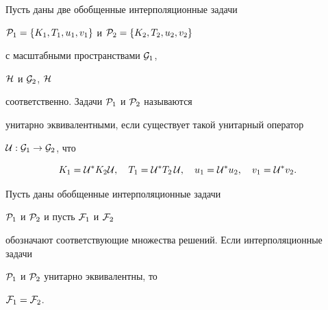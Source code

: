 \begin{defn}


Пусть даны две обобщенные интерполяционные задачи


${\cal P}_1 = \{ K_1,T_1,u_1,v_1 \}$ и $ {\cal P}_2 = \{ K_2,T_2,u_2,v_2 \}$


с масштабными пространствами ${\cal G}_1$,


${\cal H}$ и ${\cal G}_2$, ${\cal H}$


соответственно. Задачи $ {\cal P}_1$ и $ {\cal P}_2$ называются


унитарно эквивалентными, если существует такой унитарный оператор


${\cal U}:{\cal G}_1\to {\cal G}_2$, что


\begin{equation}


K_1={\cal U}^*K_2{\cal U},\quad T_1={\cal U}^*T_2\,{\cal U},\quad


u_1={\cal U}^*u_2,\quad v_1={\cal U}^*v_2.


\end{equation}


\end{defn}





\begin{thm}


Пусть даны обобщенные интерполяционные задачи


${\cal P}_1$ и $ {\cal P}_2$ и пусть ${\cal F}_1$ и ${\cal F}_2$


обозначают соответствующие множества решений. Если интерполяционные задачи


${\cal P}_1 $ и $ {\cal P}_2 $ унитарно эквивалентны, то


${\cal F}_1={\cal F}_2$.


\end{thm}





